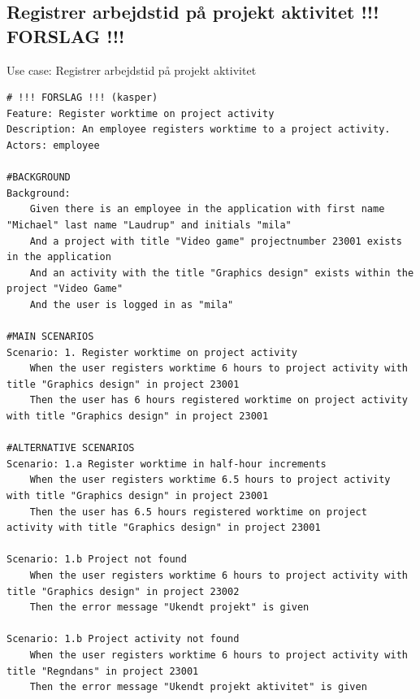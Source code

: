 \subsection{Registrer arbejdstid på projekt aktivitet !!! FORSLAG !!!}
\begin{listing}[H]
    \centering
    \caption{Use case: Registrer arbejdstid på projekt aktivitet} \label{lst:usecase_register_worktime_projectactivity}
    \begin{verbatim}  
# !!! FORSLAG !!! (kasper)
Feature: Register worktime on project activity
Description: An employee registers worktime to a project activity.
Actors: employee

#BACKGROUND
Background:
    Given there is an employee in the application with first name "Michael" last name "Laudrup" and initials "mila"
    And a project with title "Video game" projectnumber 23001 exists in the application
    And an activity with the title "Graphics design" exists within the project "Video Game"
    And the user is logged in as "mila"

#MAIN SCENARIOS
Scenario: 1. Register worktime on project activity
    When the user registers worktime 6 hours to project activity with title "Graphics design" in project 23001
    Then the user has 6 hours registered worktime on project activity with title "Graphics design" in project 23001

#ALTERNATIVE SCENARIOS
Scenario: 1.a Register worktime in half-hour increments
    When the user registers worktime 6.5 hours to project activity with title "Graphics design" in project 23001
    Then the user has 6.5 hours registered worktime on project activity with title "Graphics design" in project 23001

Scenario: 1.b Project not found
    When the user registers worktime 6 hours to project activity with title "Graphics design" in project 23002
    Then the error message "Ukendt projekt" is given 
    
Scenario: 1.b Project activity not found
    When the user registers worktime 6 hours to project activity with title "Regndans" in project 23001
    Then the error message "Ukendt projekt aktivitet" is given 

    \end{verbatim}
\end{listing}

